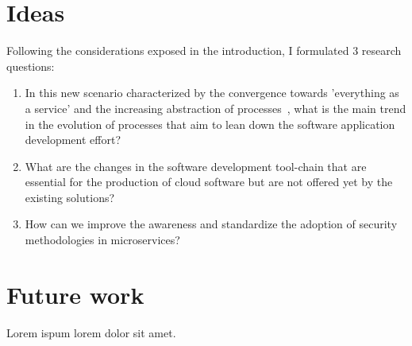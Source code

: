 \documentclass[a4paper, 10pt, conference]{ieeeconf}
\begin{document}
\section{Ideas}

Following the considerations exposed in the introduction, I formulated 3 research questions:
\begin{enumerate}
 	\item In this new scenario characterized by the convergence towards 'everything as a service' and the increasing abstraction of processes~\cite{automatic-dev}, what is the main trend in the evolution of processes that aim to lean down the software application development effort?
 	\item What are the changes in the software development tool-chain that  are essential for the production of cloud software but are not offered yet by the existing solutions?
	\item How can we improve the awareness and standardize the adoption of security methodologies in microservices?
\end{enumerate}

\section{Future work}

Lorem ispum lorem dolor sit amet.



\end{document}
